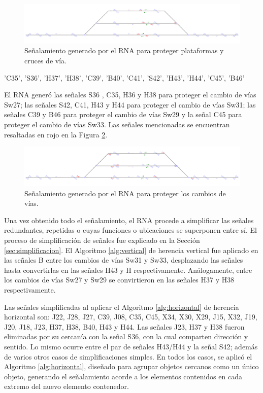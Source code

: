 \begin{figure}[H]
	\centering
	\includegraphics[width=1\textwidth]{resultados-obtenidos/ejemplo9/images/9_step3.png}
	\centering\caption{Señalamiento generado por el RNA para proteger plataformas y cruces de vía.}
	\label{fig:EJ9_5}
\end{figure}

'C35', 'S36', 'H37', 'H38', 'C39', 'B40', 'C41', 'S42', 'H43', 'H44', 'C45', 'B46'

El RNA generó las señales S36 , C35, H36 y H38 para proteger el cambio de vías Sw27; las señales S42, C41, H43 y H44 para proteger el cambio de vías Sw31; las señales C39 y B46 para proteger el cambio de vías Sw29 y la señal C45 para proteger el cambio de vías Sw33. Las señales mencionadas se encuentran resaltadas en rojo en la Figura \ref{fig:EJ9_6}.

\begin{figure}[H]
	\centering
	\includegraphics[width=1\textwidth]{resultados-obtenidos/ejemplo9/images/9_step4.png}
	\centering\caption{Señalamiento generado por el RNA para proteger los cambios de vías.}
	\label{fig:EJ9_6}
\end{figure}

Una vez obtenido todo el señalamiento, el RNA procede a simplificar las señales redundantes, repetidas o cuyas funciones o ubicaciones se superponen entre sí. El proceso de simplificación de señales fue explicado en la Sección \ref{sec:simplificacion}. El Algoritmo \ref{alg:vertical} de herencia vertical fue aplicado en las señales B entre los cambios de vías Sw31 y Sw33, desplazando las señales hasta convertirlas en las señales H43 y H respectivamente. Análogamente, entre los cambios de vías Sw27 y Sw29 se convirtieron en las señales H37 y H38 respectivamente.

Las señales simplificadas al aplicar el Algoritmo \ref{alg:horizontal} de herencia horizontal son: J22, J28, J27, C39, J08, C35, C45, X34, X30, X29, J15, X32, J19, J20, J18, J23, H37, H38, B40, H43 y H44. Las señales J23, H37 y H38 fueron eliminadas por su cercanía con la señal S36, con la cual comparten dirección y sentido. Lo mismo ocurre entre el par de señales H43/H44 y la señal S42; además de varios otros casos de simplificaciones simples. En todos los casos, se aplicó el Algoritmo \ref{alg:horizontal}, diseñado para agrupar objetos cercanos como un único objeto, generando el señalamiento acorde a los elementos contenidos en cada extremo del nuevo elemento contenedor.

